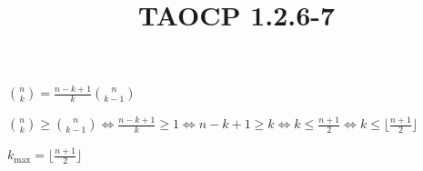 \documentclass{article}
\title{TAOCP 1.2.6\mbox{-}7}
\begin{document}
\maketitle

\( \binom{n}{k} = \frac{n-k+1}{k} \binom{n}{k-1} \)

\( \binom{n}{k} \geq \binom{n}{k-1} \iff \frac{n-k+1}{k} \geq 1 \iff n - k + 1 \geq k \iff k \leq \frac{n+1}{2} \iff k \leq \lfloor\frac{n+1}{2}\rfloor \)

\( k_{\max} = \lfloor\frac{n+1}{2}\rfloor \)
\end{document}
